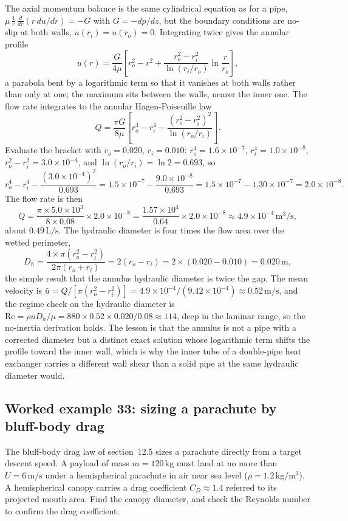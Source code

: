The axial momentum balance is the same cylindrical equation as for a
pipe, $\mu\,\tfrac1r\,\tfrac{d}{dr}(r\,du/dr) = -G$ with $G = -dp/dz$,
but the boundary conditions are no-slip at both walls, $u(r_i) = u(r_o) =
0$. Integrating twice gives the annular profile
\[
u(r) = \frac{G}{4\mu}\!\left[r_o^2 - r^2 + \frac{r_o^2 - r_i^2}{\ln(r_i/
r_o)}\ln\frac{r}{r_o}\right],
\]
a parabola bent by a logarithmic term so that it vanishes at both walls
rather than only at one; the maximum sits between the walls, nearer the
inner one. The flow rate integrates to the annular Hagen-Poiseuille law
\[
Q = \frac{\pi G}{8\mu}\!\left[r_o^4 - r_i^4 - \frac{(r_o^2 - r_i^2)^2}{
\ln(r_o/r_i)}\right].
\]
Evaluate the bracket with $r_o = 0.020$, $r_i = 0.010$: $r_o^4 = 1.6\times
10^{-7}$, $r_i^4 = 1.0\times10^{-8}$, $r_o^2 - r_i^2 = 3.0\times10^{-4}$,
and $\ln(r_o/r_i) = \ln 2 = 0.693$, so
\[
r_o^4 - r_i^4 - \frac{(3.0\times10^{-4})^2}{0.693} = 1.5\times10^{-7} -
\frac{9.0\times10^{-8}}{0.693} = 1.5\times10^{-7} - 1.30\times10^{-7} =
2.0\times10^{-8}.
\]
The flow rate is then
\[
Q = \frac{\pi\times5.0\times10^{3}}{8\times0.08}\times2.0\times10^{-8}
= \frac{1.57\times10^{4}}{0.64}\times2.0\times10^{-8} \approx 4.9\times
10^{-4}\,\si{\meter\cubed\per\second},
\]
about $0.49\,\text{L/s}$. The hydraulic diameter is four times the flow
area over the wetted perimeter,
\[
D_h = \frac{4\times\pi(r_o^2 - r_i^2)}{2\pi(r_o + r_i)} = 2(r_o - r_i) =
2\times(0.020 - 0.010) = 0.020\,\si{\meter},
\]
the simple result that the annulus hydraulic diameter is twice the gap.
The mean velocity is $\bar u = Q/[\pi(r_o^2 - r_i^2)] = 4.9\times10^{-4}/
(9.42\times10^{-4}) \approx 0.52\,\si{\meter\per\second}$, and the
regime check on the hydraulic diameter is $\text{Re} = \rho\bar u D_h/\mu
= 880\times0.52\times0.020/0.08 \approx 114$, deep in the laminar range,
so the no-inertia derivation holds. The lesson is that the annulus is not
a pipe with a corrected diameter but a distinct exact solution whose
logarithmic term shifts the profile toward the inner wall, which is why
the inner tube of a double-pipe heat exchanger carries a different wall
shear than a solid pipe at the same hydraulic diameter would.

\subsection*{Worked example 33: sizing a parachute by bluff-body drag}

The bluff-body drag law of section~12.5 sizes a parachute directly from a
target descent speed. A payload of mass $m = 120\,\si{\kilogram}$ must
land at no more than $U = 6\,\si{\meter\per\second}$ under a
hemispherical parachute in air near sea level ($\rho = 1.2\,\si{\kilogram
\per\meter\cubed}$). A hemispherical canopy carries a drag coefficient
$C_D\approx1.4$ referred to its projected mouth area. Find the canopy
diameter, and check the Reynolds number to confirm the drag coefficient.

